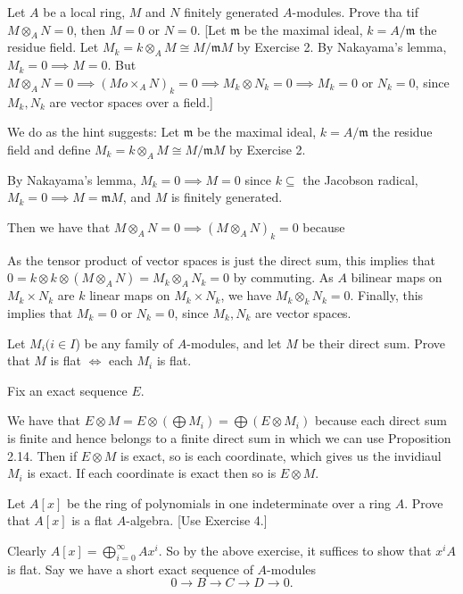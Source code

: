 \documentclass[a4paper]{exam}
\begin{document}
\begin{questions}
	\question Let $A $ be a local ring, $M $ and $N $ finitely generated $A $-modules. Prove tha tif $M \otimes_A N = 0 $, then $M = 0 $ or $N = 0 $.
	[Let $\mathfrak{m} $ be the maximal ideal, $k = A / \mathfrak{m} $ the residue field. Let $M_k = k \otimes _A M \cong M / \mathfrak{m}M $ by Exercise 2. By Nakayama's lemma, $M_k = 0 \implies M = 0$. But $M \otimes_A N = 0 \implies (Mo\times _A N)_k = 0\implies M_k \otimes N_k = 0 \implies M_k = 0 $ or $N_k = 0 $, since $M_k,N_k $ are vector spaces over a field.]
	\begin{solution}
		We do as the hint suggests:
		Let $\mathfrak{m} $ be the maximal ideal, $k = A / \mathfrak{m} $ the residue field and define $M_k = k \otimes _A M \cong M / \mathfrak{m}M $ by Exercise 2.

		By Nakayama's lemma, $M_k = 0 \implies M = 0$ since $k \subseteq $ the Jacobson radical, $M_k = 0\implies M = \mathfrak{m}M$, and $M$ is finitely generated.

		Then we have that $M \otimes_A N = 0 \implies (M\otimes _A N)_k = 0$ because

		As the tensor product of vector spaces is just the direct sum, this implies that $0 = k \otimes k \otimes  (M \otimes _A N) = M_k \otimes_A N_k = 0$ by commuting.
		As $A $ bilinear maps on $M_k \times N_k$ are $k $ linear maps on $M_k\times N_k $, we have $M_k \otimes _k N_k = 0$.
		Finally, this implies that $M_k = 0 $ or $N_k = 0 $, since $M_k,N_k $ are vector spaces.
	\end{solution}

	\question Let $M_i (i\in I $) be any family of $A $-modules, and let $M $ be their direct sum. Prove that $M $ is flat $\iff $ each $M_i $ is flat.
	\begin{solution}
		Fix an exact sequence $E $.

		We have that $E \otimes M = E \otimes (\bigoplus M_i) = \bigoplus (E \otimes M_i)$ because each direct sum is finite and hence belongs to a finite direct sum in which we can use Proposition 2.14.
		Then if $E \otimes M $ is exact, so is each coordinate, which gives us the invidiaul $M_i $ is exact.
		If each coordinate is exact then so is $E \otimes M $.
	\end{solution}

	\question Let $A[x] $ be the ring of polynomials in one indeterminate over a ring $A $. Prove that $A[x] $ is a flat $A $-algebra. [Use Exercise 4.]
	\begin{solution}
		Clearly $A[x] = \bigoplus_{i=0}^{\infty} Ax^i$.
		So by the above exercise, it suffices to show that $x^i A $ is flat.
		Say we have a short exact sequence of $A $-modules
		\[
			0 \to B \to C \to D \to 0
		.\]


\end{solution}
\end{questions}
\end{document}
